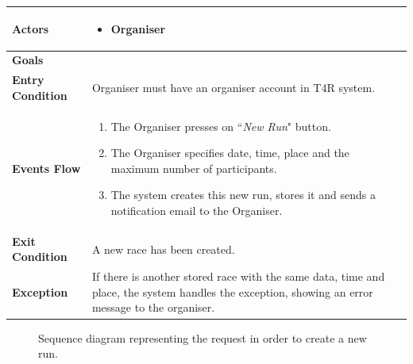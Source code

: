             \begin{table}[H]
            	\centering
                
                \begin{tabular}{|p{3cm}|p{8.2cm}|}
                    \hline
                    \textbf{Actors} & \begin{itemize}
                        \item Organiser
                    \end{itemize} \\
                     \hline
                    \textbf{Goals} & \\ 
                     \hline
                    \textbf{Entry Condition} & Organiser must have an organiser account in T4R system.\\
                     \hline
                    \textbf{Events Flow} & \begin{enumerate}
                                                \item The Organiser presses on ``\emph{New Run}" button.
                                                \item The Organiser specifies date, time, place and the maximum number of participants.
                                                \item The system creates this new run, stores it and sends a notification email to the Organiser.
                                            \end{enumerate}\\
                     \hline
                    \textbf{Exit Condition} & A new race has been created.\\
                     \hline
                    \textbf{Exception} & If there is another stored race with the same data, time and place, the system                       handles the exception, showing an error message to the organiser. \\
                     \hline
                \end{tabular}  
            \end{table} 
            
            \begin{figure}[H]
                \centering
                \caption{Sequence diagram representing the request in order to create a new run.}
                \label{fig:T4R-run-organization}
            \end{figure}
            
